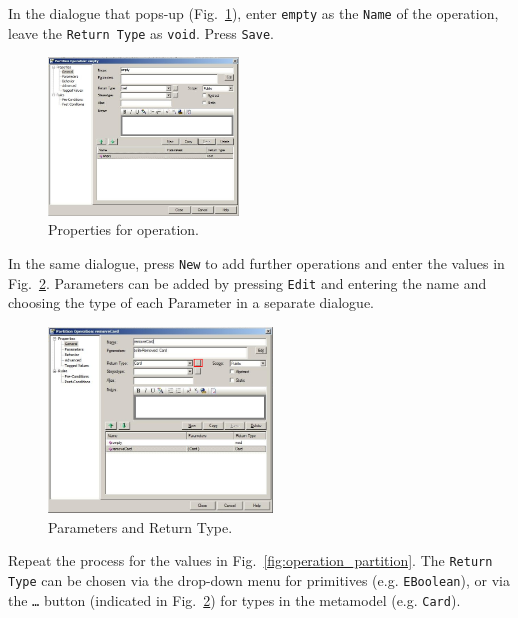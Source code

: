 In the dialogue that pops-up (Fig.~\ref{fig:operation_properties}), enter
\texttt{empty} as the \texttt{Name} of the operation, leave the \texttt{Return
Type} as \texttt{void}.  Press \texttt{Save}.
 
\begin{figure}[htbp]
	\centering
  \includegraphics[width=0.45\textwidth]{pics/memBoxBilder/memBox37.png}
	\caption{Properties for operation.}
	\label{fig:operation_properties}
\end{figure}

\clearpage

In the same dialogue, press \texttt{New} to add further operations and enter the
values in Fig.~\ref{fig:operation_parameters}.  Parameters can be added by
pressing \texttt{Edit} and entering the name and choosing the type of each
Parameter in a separate dialogue.

\begin{figure}[htbp]
	\centering
  \includegraphics[width=0.53\textwidth]{pics/memBoxBilder/memBox38.png}
	\caption{Parameters and Return Type.}
	\label{fig:operation_parameters} 
\end{figure}

Repeat the process for the values in Fig.~\ref{fig:operation_partition}.  The
\texttt{Return Type} can be chosen via the drop-down menu for primitives
(e.g. \texttt{EBoolean}), or via the \texttt{\ldots} button (indicated in
Fig.~\ref{fig:operation_parameters}) for types in the metamodel
(e.g. \texttt{Card}).

